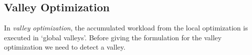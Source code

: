 \documentclass[10pt,conference,compsocconf,letterpaper]{IEEEtran}
\begin{document}
\begin{comment}
At this slot we have knowledge of the workload from $L_{t_r-\delta}$ to $L_{t_r}$ and hence we know the delayed workload from $l^\delta_{t_r}$ to $l^\delta_{t_r+\delta}$. To determine the values of $x_{t_r}$ and $m_{t_r}$ for the current slot $t_r$, . Since we are optimizing $x_{t_r}$, there will be some  accumulated workload (possibly zero) for the local optimization at time $t_r$.  Let $B_{t_r}^l \ge 0$ be the accumulated workload for the local optimization at time $t_r$. Then $B_{t_r}^l$ is the sum of three parts: (i) the local accumulated workload from the previous slot $B_{t_r-1}^l$, (ii) the accumulated workload due to the difference in $l^\delta_{t_r}$ and  $x_{t_r}$ and (iii) the change of global accumulation $\Delta B^g_{t_r}$ (which will be discussed in the next subsection) due to the change in the estimate for maximum accumulation $\sum m_t$ according to lemma~\ref{lemma:offline1}. Hence $$B_{t_r}^l = (B_{t_r-1}^l + (l^\delta_{t_r} - x_{t_r}))^+ + \Delta B^g_{t_r} \text{ and } B_0^l = 0$$

Since $B_{t_r}^l \ge 0$, we use only the positive difference. If the difference is negative, we just use zero. This phenomenon is captured using the $^+$ sign where $a^+ = a, \text{ if } a\ge 0; 0, \text{ otherwise}$. Let $t'_r = t_r + \delta$. Note that the amount of accumulated workload accounted in $B_t$ is the actual accumulated workload which is different from the accumulation constraint. We now formulate the optimization for $t_r \le t \le t'_r$  such that it follows the $l^\delta$ curve as well as smooths the wrinkles in the delayed curve $l^\delta$. Hence in the formulation we restrict the accumulation constraint (C3) to follow the $l^\delta$ curve.
\end{comment}


\begin{comment}
\begin{eqnarray}
\label{lopt}
& \text{min}_{m_t}\quad & \sum_{t=t_r}^{t_r+D}  C(m_t) + \beta \sum_{t=t_r}^{t_r+D} |m_{t}-m_{t-1}|\\
& \text{subject to}\quad &  \sum_{t=t_r}^{t_r+D} (l^\delta_{j} - x_{j}) = -B_{t_r-1}^{l}  \qquad \nonumber.
\end{eqnarray}
\end{comment}


\subsection{Valley Optimization}
In {\it valley optimization}, the accumulated workload from the local optimization is executed in `global valleys'. Before giving the formulation for the valley optimization we need to detect a valley.
\end{document}
